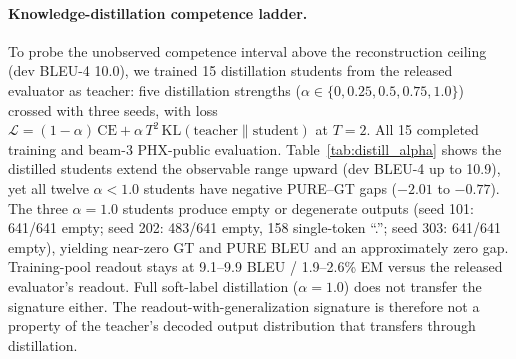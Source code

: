 \documentclass[pdflatex,sn-chicago]{sn-jnl}
\begin{document}
\paragraph{Knowledge-distillation competence ladder.}
\label{sec:distillation_ladder}
To probe the unobserved competence interval above the reconstruction ceiling (dev BLEU-4 10.0), we trained 15 distillation students from the released evaluator as teacher: five distillation strengths ($\alpha\in\{0,0.25,0.5,0.75,1.0\}$) crossed with three seeds, with loss $\mathcal{L} = (1-\alpha)\,\text{CE} + \alpha\,T^2\,\text{KL}(\text{teacher} \| \text{student})$ at $T{=}2$. All 15 completed training and beam-3 PHX-public evaluation. Table~\ref{tab:distill_alpha} shows the distilled students extend the observable range upward (dev BLEU-4 up to 10.9), yet all twelve $\alpha{<}1.0$ students have negative PURE--GT gaps ($-2.01$ to $-0.77$). The three $\alpha{=}1.0$ students produce empty or degenerate outputs (seed 101: 641/641 empty; seed 202: 483/641 empty, 158 single-token ``.''; seed 303: 641/641 empty), yielding near-zero GT and PURE BLEU and an approximately zero gap. Training-pool readout stays at 9.1--9.9 BLEU / 1.9--2.6\% EM versus the released evaluator's readout. Full soft-label distillation ($\alpha{=}1.0$) does not transfer the signature either. The readout-with-generalization signature is therefore not a property of the teacher's decoded output distribution that transfers through distillation.
\end{document}
